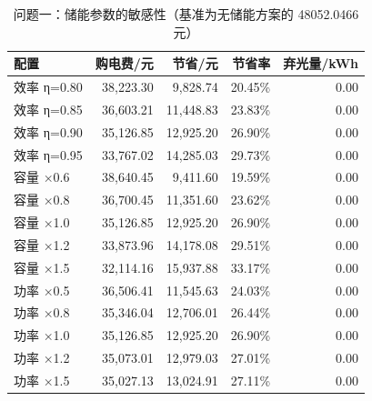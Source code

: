 \begin{table}[H]
  \centering
  \caption{问题一：储能参数的敏感性（基准为无储能方案的 \num{48052.0466} 元）}
  \label{tab:q1-sens}
  \small
  \begin{tabular}{lrrrr}
    \toprule
    配置 & 购电费/元 & 节省/元 & 节省率 & 弃光量/kWh \\
    \midrule
    效率 η=0.80 & 38,223.30 & 9,828.74 & 20.45\% & 0.00 \\
    效率 η=0.85 & 36,603.21 & 11,448.83 & 23.83\% & 0.00 \\
    效率 η=0.90 & 35,126.85 & 12,925.20 & 26.90\% & 0.00 \\
    效率 η=0.95 & 33,767.02 & 14,285.03 & 29.73\% & 0.00 \\
    容量 ×0.6 & 38,640.45 & 9,411.60 & 19.59\% & 0.00 \\
    容量 ×0.8 & 36,700.45 & 11,351.60 & 23.62\% & 0.00 \\
    容量 ×1.0 & 35,126.85 & 12,925.20 & 26.90\% & 0.00 \\
    容量 ×1.2 & 33,873.96 & 14,178.08 & 29.51\% & 0.00 \\
    容量 ×1.5 & 32,114.16 & 15,937.88 & 33.17\% & 0.00 \\
    功率 ×0.5 & 36,506.41 & 11,545.63 & 24.03\% & 0.00 \\
    功率 ×0.8 & 35,346.04 & 12,706.01 & 26.44\% & 0.00 \\
    功率 ×1.0 & 35,126.85 & 12,925.20 & 26.90\% & 0.00 \\
    功率 ×1.2 & 35,073.01 & 12,979.03 & 27.01\% & 0.00 \\
    功率 ×1.5 & 35,027.13 & 13,024.91 & 27.11\% & 0.00 \\
    \bottomrule
  \end{tabular}
\end{table}
